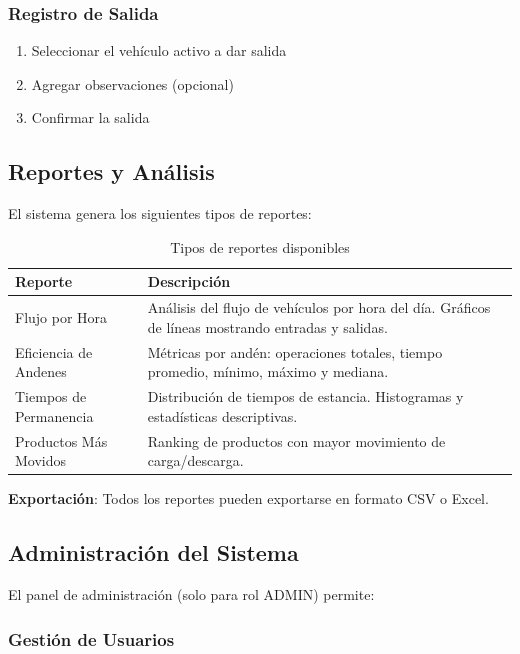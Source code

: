 \documentclass[12pt,a4paper]{article}
\begin{document}
\subsubsection{Registro de Salida}

\begin{enumerate}
    \item Seleccionar el vehículo activo a dar salida
    \item Agregar observaciones (opcional)
    \item Confirmar la salida
\end{enumerate}

\subsection{Reportes y Análisis}

El sistema genera los siguientes tipos de reportes:

\begin{table}[H]
    \centering
    \begin{tabularx}{\textwidth}{|l|X|}
        \hline
        \textbf{Reporte} & \textbf{Descripción} \\
        \hline
        Flujo por Hora & Análisis del flujo de vehículos por hora del día. Gráficos de líneas mostrando entradas y salidas. \\
        \hline
        Eficiencia de Andenes & Métricas por andén: operaciones totales, tiempo promedio, mínimo, máximo y mediana. \\
        \hline
        Tiempos de Permanencia & Distribución de tiempos de estancia. Histogramas y estadísticas descriptivas. \\
        \hline
        Productos Más Movidos & Ranking de productos con mayor movimiento de carga/descarga. \\
        \hline
    \end{tabularx}
    \caption{Tipos de reportes disponibles}
\end{table}

\textbf{Exportación}: Todos los reportes pueden exportarse en formato CSV o Excel.

\subsection{Administración del Sistema}

El panel de administración (solo para rol ADMIN) permite:

\subsubsection{Gestión de Usuarios}
\end{document}

